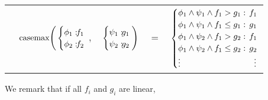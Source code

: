 {\footnotesize
\begin{center}
\begin{tabular}{r c c c l}
&
\hspace{-7mm} $\casemax \Bigg(
  \begin{cases}
    \phi_1: \hspace{-2mm} & \hspace{-2mm} f_1 \\ 
    \phi_2: \hspace{-2mm} & \hspace{-2mm} f_2 \\ 
  \end{cases}$
$,$
&
\hspace{-4mm}
  $\begin{cases}
    \psi_1: \hspace{-2mm} & \hspace{-2mm} g_1 \\ 
    \psi_2: \hspace{-2mm} & \hspace{-2mm} g_2 \\ 
  \end{cases} \Bigg)$
&
\hspace{-4mm} 
$ = $
&
\hspace{-4mm}
  $\begin{cases}
  \phi_1 \wedge \psi_1 \wedge f_1 > g_1    : & \hspace{-2mm} f_1 \\ 
  \phi_1 \wedge \psi_1 \wedge f_1 \leq g_1 : & \hspace{-2mm} g_1 \\ 
  \phi_1 \wedge \psi_2 \wedge f_1 > g_2    : & \hspace{-2mm}f_1 \\ 
  \phi_1 \wedge \psi_2 \wedge f_1 \leq g_2 : & \hspace{-2mm} g_2 \\ 
  \vdots & \vdots
  \end{cases}$
\end{tabular}
\end{center}
} We remark that if all $f_i$ and $g_i$ are linear,
